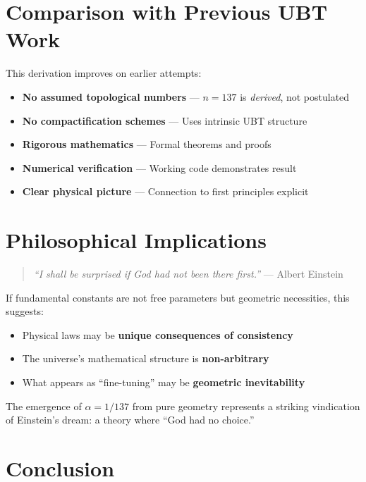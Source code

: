 \documentclass[12pt, a4paper]{article}
\begin{document}
\section{Comparison with Previous UBT Work}

This derivation improves on earlier attempts:

\begin{itemize}
\item \textbf{No assumed topological numbers} — $n=137$ is \emph{derived}, not postulated
\item \textbf{No compactification schemes} — Uses intrinsic UBT structure
\item \textbf{Rigorous mathematics} — Formal theorems and proofs
\item \textbf{Numerical verification} — Working code demonstrates result
\item \textbf{Clear physical picture} — Connection to first principles explicit
\end{itemize}

\section{Philosophical Implications}

\begin{quote}
\emph{``I shall be surprised if God had not been there first.''} — Albert Einstein
\end{quote}

If fundamental constants are not free parameters but geometric necessities, this suggests:

\begin{itemize}
\item Physical laws may be \textbf{unique consequences of consistency}
\item The universe's mathematical structure is \textbf{non-arbitrary}
\item What appears as ``fine-tuning'' may be \textbf{geometric inevitability}
\end{itemize}

The emergence of $\alpha = 1/137$ from pure geometry represents a striking vindication of Einstein's dream: a theory where ``God had no choice.''

\section{Conclusion}

\begin{center}
\end{center}
\end{document}
